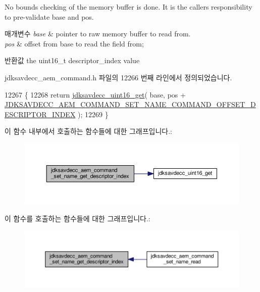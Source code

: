 No bounds checking of the memory buffer is done. It is the caller\textquotesingle{}s responsibility to pre-\/validate base and pos.


\begin{DoxyParams}{매개변수}
{\em base} & pointer to raw memory buffer to read from. \\
\hline
{\em pos} & offset from base to read the field from; \\
\hline
\end{DoxyParams}
\begin{DoxyReturn}{반환값}
the uint16\+\_\+t descriptor\+\_\+index value 
\end{DoxyReturn}


jdksavdecc\+\_\+aem\+\_\+command.\+h 파일의 12266 번째 라인에서 정의되었습니다.


\begin{DoxyCode}
12267 \{
12268     \textcolor{keywordflow}{return} \hyperlink{group__endian_ga3fbbbc20be954aa61e039872965b0dc9}{jdksavdecc\_uint16\_get}( base, pos + 
      \hyperlink{group__command__set__name_ga30421fd8529e96a9f7abcf45318feed9}{JDKSAVDECC\_AEM\_COMMAND\_SET\_NAME\_COMMAND\_OFFSET\_DESCRIPTOR\_INDEX}
       );
12269 \}
\end{DoxyCode}


이 함수 내부에서 호출하는 함수들에 대한 그래프입니다.\+:
\nopagebreak
\begin{figure}[H]
\begin{center}
\leavevmode
\includegraphics[width=350pt]{group__command__set__name_gaf3f01f5644f0d3adc2dc5d992c000d59_cgraph}
\end{center}
\end{figure}




이 함수를 호출하는 함수들에 대한 그래프입니다.\+:
\nopagebreak
\begin{figure}[H]
\begin{center}
\leavevmode
\includegraphics[width=350pt]{group__command__set__name_gaf3f01f5644f0d3adc2dc5d992c000d59_icgraph}
\end{center}
\end{figure}


